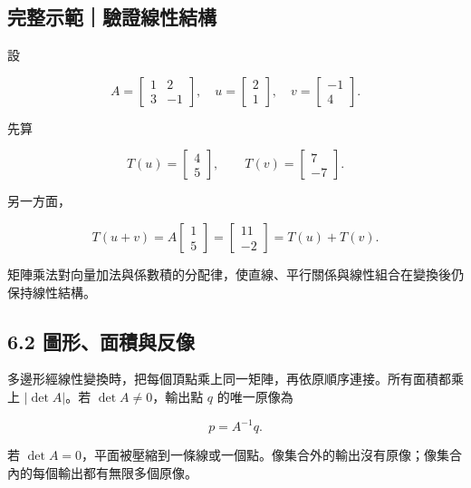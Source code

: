 \documentclass[11pt,a4paper]{article}
\begin{document}
\begin{HandoutWorkedExample}

\subsection{完整示範｜驗證線性結構}\label{ux5b8cux6574ux793aux7bc4ux9a57ux8b49ux7ddaux6027ux7d50ux69cb}

設

\[
A=\begin{bmatrix}1&2\\3&-1\end{bmatrix},
\quad
u=\begin{bmatrix}2\\1\end{bmatrix},
\quad
v=\begin{bmatrix}-1\\4\end{bmatrix}.
\]

先算

\[
T(u)=\begin{bmatrix}4\\5\end{bmatrix},
\qquad
T(v)=\begin{bmatrix}7\\-7\end{bmatrix}.
\]

另一方面，

\[
T(u+v)
=A\begin{bmatrix}1\\5\end{bmatrix}
=\begin{bmatrix}11\\-2\end{bmatrix}
=T(u)+T(v).
\]

矩陣乘法對向量加法與係數積的分配律，使直線、平行關係與線性組合在變換後仍保持線性結構。

\end{HandoutWorkedExample}

\subsection{6.2 圖形、面積與反像}\label{ux5716ux5f62ux9762ux7a4dux8207ux53cdux50cf}

多邊形經線性變換時，把每個頂點乘上同一矩陣，再依原順序連接。所有面積都乘上 \(|\det A|\)。若 \(\det A\ne0\)，輸出點 \(q\) 的唯一原像為

\[
p=A^{-1}q.
\]

若 \(\det A=0\)，平面被壓縮到一條線或一個點。像集合外的輸出沒有原像；像集合內的每個輸出都有無限多個原像。
\end{document}
